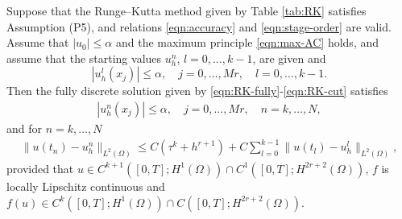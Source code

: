 \documentclass[10pt,final,leqno,onefignum,onetabnum]{siamltex}%
\def\II{(\Omega)}
\begin{document}
\begin{theorem}\label{thm:RK-error}
Suppose that the Runge--Kutta method given by Table \ref{tab:RK} satisfies Assumption (P5),
and relations \eqref{eqn:accuracy} and \eqref{eqn:stage-order}  are valid.
Assume that $|u_0| \le \alpha$ and the maximum principle \eqref{eqn:max-AC} holds,
 and assume that the starting values $u_h^n$, $l=0,\dots,k-1$, are given and
$$
|u_h^l(x_j)|\le \alpha , \quad j=0,\dots,Mr,\quad l=0,\dots,k-1.
$$
Then the   {fully discrete} solution given by \eqref{eqn:RK-fully}-\eqref{eqn:RK-cut} satisfies
\begin{align*}
|u_h^n(x_j)|\le \alpha , \quad j=0,\dots,Mr,\quad n=k,\dots,N,
\end{align*}
and  {for $n=k,\ldots,N$}
\begin{align*}
  \| u(t_n) - u_h^n \|_{L^2(\Omega)} \le  C(\tau^k + h^{r+1}) + C\sum_{l=0}^{k-1}\| u(t_l) - u_h^l \|_{L^2(\Omega)} ,
\end{align*}
provided that {$u\in C^{k+1}([0,T]; H^1\II) \cap C^1([0,T];H^{2r+2}(\Omega))$,
$f$ is locally Lipschitz continuous and $f(u)\in C^k([0,T];H^1\II)\cap C([0,T];H^{2r+2}\II)$.}
\end{theorem}
\end{document}
